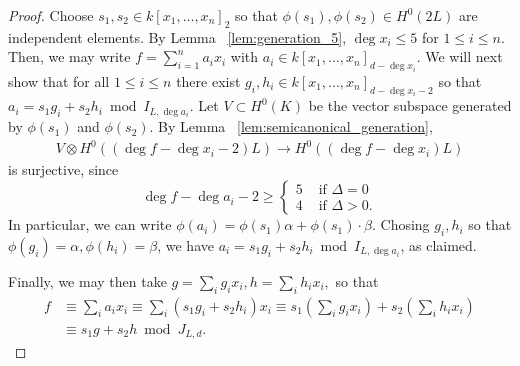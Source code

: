 \documentclass{amsart}
\theoremstyle{plain}
\theoremstyle{definition}
\theoremstyle{remark}
\numberwithin{equation}{section}
\begin{document}
\begin{proof}
Choose $s_1,s_2 \in k[x_1, \ldots, x_n]_2$ so that $\phi(s_1),\phi(s_2) \in H^0(2L)$ are independent elements.
By Lemma ~\ref{lem:generation_5}, $\deg x_i \leq 5$ for $1 \leq i \leq n$. Then, we may write $f = \sum_{i=1}^{n}a_ix_i$ with $a_i \in k[x_1,\ldots, x_n]_{d-\deg x_i}$.
We will next show that for all $1 \leq i \leq n$ there exist $g_i, h_i \in k[x_1, \ldots, x_n]_{d - \deg x_i- 2}$ so that $a_i = s_1g_i + s_2h_i \bmod I_{L,\deg a_i}.$ 
Let $V \subset H^0(K)$ be the vector subspace generated by $\phi(s_1)$ and $\phi(s_2)$. By Lemma ~\ref{lem:semicanonical_generation},
\begin{align*}
	V \otimes H^0((\deg f-\deg x_i-2)L) \rightarrow H^0((\deg f-\deg x_i)L)
\end{align*}
is surjective, since
$$
\deg f- \deg a_i-2 \geq \begin{cases}
	5 &\text{ if }\Delta = 0\\
	4 &\text{ if }\Delta > 0.
\end{cases}$$
In particular, we can write $\phi(a_i) = \phi(s_1) \alpha + \phi(s_1) \cdot \beta$. Chosing $g_i,h_i$ so that $\phi(g_i) = \alpha,\phi(h_i) = \beta$, we have $a_i = s_1 g_i + s_2 h_i \bmod I_{L,\deg a_i}$, as claimed.

Finally, we may then take $g = \sum_{i}^{}g_ix_i,h = \sum_{i}^{}h_ix_i,$ so that 
\begin{align*}
	f &\equiv \sum_{i}^{}a_i x_i \equiv \sum_{i}^{}(s_1g_i + s_2h_i)x_i \equiv s_1 \left( \sum_{i}^{}g_i x_i \right) + s_2 \left( \sum_{i}^{}h_i x_i \right) \\
	&\equiv s_1 g + s_2 h \bmod J_{L,d}.
\end{align*}
\end{proof}
\end{document}
